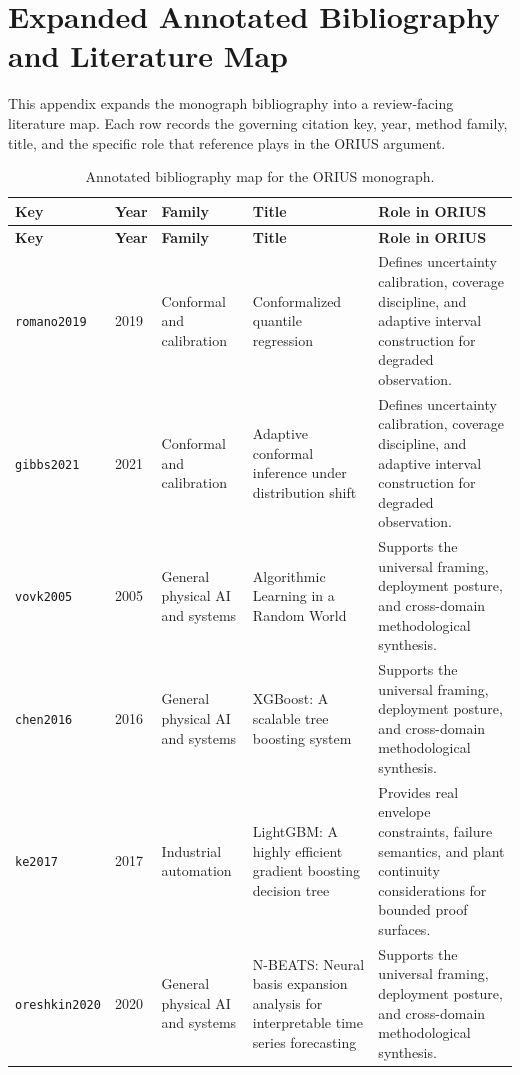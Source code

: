 \chapter{Expanded Annotated Bibliography and Literature Map}
\label{app:annotated-bibliography-map}

This appendix expands the monograph bibliography into a review-facing literature map. Each row records the governing citation key, year, method family, title, and the specific role that reference plays in the ORIUS argument.

\begin{longtable}{p{}p{}p{}p{}p{}}
\caption{Annotated bibliography map for the ORIUS monograph.}\label{tab:annotated-bibliography-map}\\
\toprule
\textbf{Key} & \textbf{Year} & \textbf{Family} & \textbf{Title} & \textbf{Role in ORIUS}\\
\midrule
\endfirsthead
\toprule
\textbf{Key} & \textbf{Year} & \textbf{Family} & \textbf{Title} & \textbf{Role in ORIUS}\\
\midrule
\endhead
\texttt{romano2019} & 2019 & Conformal and calibration & Conformalized quantile regression & Defines uncertainty calibration, coverage discipline, and adaptive interval construction for degraded observation.\\
\texttt{gibbs2021} & 2021 & Conformal and calibration & Adaptive conformal inference under distribution shift & Defines uncertainty calibration, coverage discipline, and adaptive interval construction for degraded observation.\\
\texttt{vovk2005} & 2005 & General physical AI and systems & Algorithmic Learning in a Random World & Supports the universal framing, deployment posture, and cross-domain methodological synthesis.\\
\texttt{chen2016} & 2016 & General physical AI and systems & XGBoost: A scalable tree boosting system & Supports the universal framing, deployment posture, and cross-domain methodological synthesis.\\
\texttt{ke2017} & 2017 & Industrial automation & LightGBM: A highly efficient gradient boosting decision tree & Provides real envelope constraints, failure semantics, and plant continuity considerations for bounded proof surfaces.\\
\texttt{oreshkin2020} & 2020 & General physical AI and systems & N-BEATS: Neural basis expansion analysis for interpretable time series forecasting & Supports the universal framing, deployment posture, and cross-domain methodological synthesis.\\

\end{longtable}
